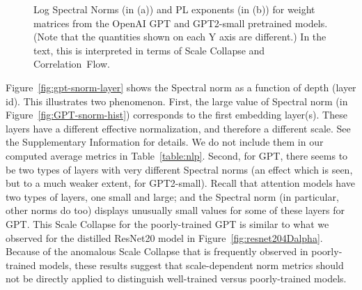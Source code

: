 \begin{figure}[hbt!] %
    \centering
    \quad
    \caption{%
             Log Spectral Norms 
             (in (a)) 
             and 
             PL exponents 
             (in (b)) 
             for weight matrices from the OpenAI GPT and GPT2-small pretrained models.  
             (Note that the quantities shown on each Y axis are different.)
             In the text, this is interpreted in terms of 
             Scale Collapse
             and 
             Correlation~Flow.
            }
    \label{fig:gpt-alpha-layers}
\end{figure}


Figure~\ref{fig:gpt-snorm-layer} shows the Spectral norm as a function of depth (layer id).
This illustrates two phenomenon.
First, the large value of Spectral norm (in Figure~\ref{fig:GPT-snorm-hist}) corresponds to the first embedding layer(s).
These layers have a different effective normalization, and therefore a different scale.
See the Supplementary Information
for details.
We do not include them in our computed average metrics in Table~\ref{table:nlp}.
Second, for GPT, there seems to be two types of layers with very different Spectral norms (an effect which is seen, but to a much weaker extent, for GPT2-small).
Recall that attention models have two types of layers, one small and large; and the Spectral norm (in particular, other norms do too) displays unusually small values for some of these layers for GPT.
This Scale Collapse for the poorly-trained GPT is similar to what we observed for the distilled ResNet20 model in Figure~\ref{fig:resnet204Dalpha}.
Because of the anomalous Scale Collapse that is frequently observed in poorly-trained models, these results suggest that scale-dependent norm metrics should not be directly applied to distinguish well-trained versus poorly-trained models. 


